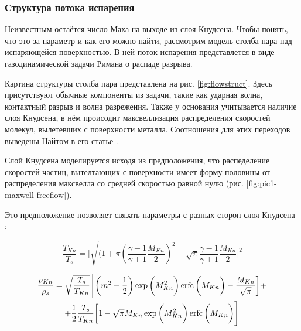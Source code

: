 \subsubsection{Структура потока испарения}

Неизвестным остаётся число Маха на выходе из слоя Кнудсена. Чтобы понять, что это за параметр и как его можно найти, рассмотрим модель столба пара над испаряющейся поверхностью. 
В ней поток испарения представлется в виде газодинамической задачи Римана о распаде разрыва.  

Картина структуры столба пара представлена на рис. \ref{fig:flowstruct}. Здесь присутствуют обычные компоненты из задачи, такие как ударная волна, контактный разрыв и волна разрежения. Также у основания учитывается наличие слоя Кнудсена, в нём происодит максвеллизация распределения скоростей молекул, вылетевших с поверхности металла. Соотношения для этих переходов выведены Найтом в его статье \cite{knight1979theoretical}.

Слой Кнудсена моделируется исходя из предположения, что распеделение скоростей частиц, вытелтающих с поверхности имеет форму половины от распределения максвелла со средней скоростью равной нулю (рис. \ref{fig:pic1-maxwell-freeflow}).



Это предположение позволяет связать параметры с разных сторон слоя Кнудсена \cite{knight1979theoretical}:

\begin{equation}
\label{eq:tempjump}
    \frac{T_{Kn}}{T_s} = \Bigg[ \sqrt{(1 + \pi \left( \frac{\gamma - 1}{\gamma + 1} \frac{M_{Kn}}{2} \right)^2} - \sqrt{\pi} \frac{\gamma - 1}{\gamma + 1} \frac{M_{Kn}}{2} \Bigg]^2
\end{equation}

\begin{multline}
\label{eq:densjump}
    \frac{\rho_{Kn}}{\rho_s} = \sqrt{\frac{T_s}{T_{Kn}}} \Bigg[ \bigg( m^2 + \frac{1}{2} \bigg) \exp\bigg(M_{Kn}^2\bigg)\operatorname{erfc}\bigg(M_{Kn}\bigg) - \frac{M_{Kn}}{\sqrt{\pi}} \bigg] + \\ + \frac{1}{2} \frac{T_s}{T_{Kn}} \bigg[ 1 - \sqrt{\pi}M_{Kn}\exp\bigg(M_{Kn}^2\bigg)\operatorname{erfc}\bigg(M_{Kn}\bigg) \Bigg]
\end{multline}

